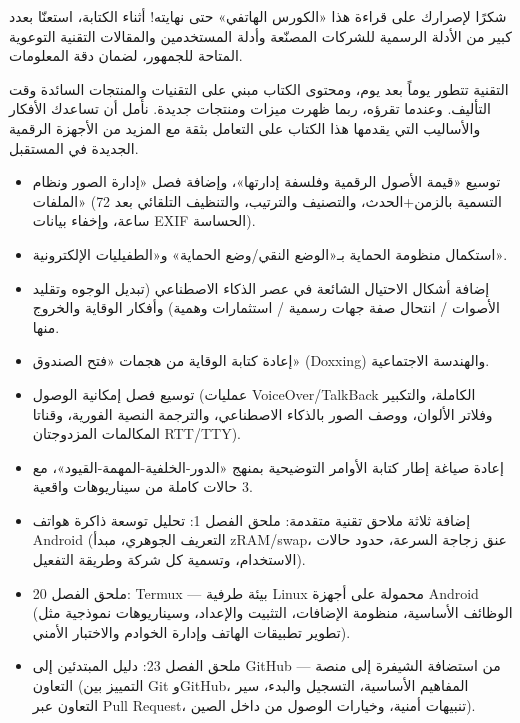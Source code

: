 
شكرًا لإصرارك على قراءة هذا «الكورس الهاتفي» حتى نهايته! أثناء الكتابة، استعنّا بعدد كبير من الأدلة الرسمية للشركات المصنّعة وأدلة المستخدمين والمقالات التقنية التوعوية المتاحة للجمهور، لضمان دقة المعلومات.

التقنية تتطور يوماً بعد يوم، ومحتوى الكتاب مبني على التقنيات والمنتجات السائدة وقت التأليف. وعندما تقرؤه، ربما ظهرت ميزات ومنتجات جديدة. نأمل أن تساعدك الأفكار والأساليب التي يقدمها هذا الكتاب على التعامل بثقة مع المزيد من الأجهزة الرقمية الجديدة في المستقبل.


\begin{itemize}
  \item توسيع «قيمة الأصول الرقمية وفلسفة إدارتها»، وإضافة فصل «إدارة الصور ونظام الملفات» (التسمية بالزمن+الحدث، والتصنيف والترتيب، والتنظيف التلقائي بعد 72 ساعة، وإخفاء بيانات EXIF الحساسة).
  \item استكمال منظومة الحماية بـ«الوضع النقي/وضع الحماية» و«الطفيليات الإلكترونية».
  \item إضافة أشكال الاحتيال الشائعة في عصر الذكاء الاصطناعي (تبديل الوجوه وتقليد الأصوات / انتحال صفة جهات رسمية / استثمارات وهمية) وأفكار الوقاية والخروج منها.
  \item إعادة كتابة الوقاية من هجمات «فتح الصندوق» (Doxxing) والهندسة الاجتماعية.
  \item توسيع فصل إمكانية الوصول (عمليات VoiceOver/TalkBack الكاملة، والتكبير وفلاتر الألوان، ووصف الصور بالذكاء الاصطناعي، والترجمة النصية الفورية، وقناتا المكالمات المزدوجتان RTT/TTY).
  \item إعادة صياغة إطار كتابة الأوامر التوضيحية بمنهج «الدور-الخلفية-المهمة-القيود»، مع 3 حالات كاملة من سيناريوهات واقعية.
  \item إضافة ثلاثة ملاحق تقنية متقدمة: ملحق الفصل 1: تحليل توسعة ذاكرة هواتف Android (التعريف الجوهري، مبدأ zRAM/swap، عنق زجاجة السرعة، حدود حالات الاستخدام، وتسمية كل شركة وطريقة التفعيل).
  \item ملحق الفصل 20: Termux — بيئة طرفية Linux محمولة على أجهزة Android (الوظائف الأساسية، منظومة الإضافات، التثبيت والإعداد، وسيناريوهات نموذجية مثل تطوير تطبيقات الهاتف وإدارة الخوادم والاختبار الأمني).
  \item ملحق الفصل 23: دليل المبتدئين إلى GitHub — من استضافة الشيفرة إلى منصة التعاون (التمييز بين Git وGitHub، المفاهيم الأساسية، التسجيل والبدء، سير التعاون عبر Pull Request، تنبيهات أمنية، وخيارات الوصول من داخل الصين).
\end{itemize}

